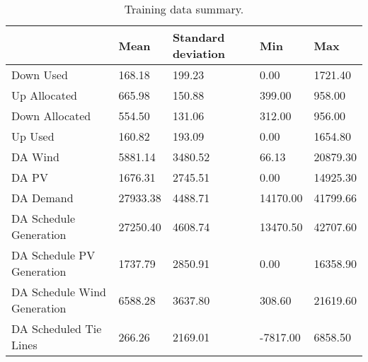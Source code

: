 \begin{table}[H] 
    \caption{Training data summary. \label{training_data_sum}}
    \begin{tabularx}{\textwidth}{CCCCC}
    \toprule
    & \textbf{Mean}	& \textbf{Standard deviation}	& \textbf{Min} & \textbf{Max}\\
    \midrule
    Down Used & 168.18 & 199.23 & 0.00 & 1721.40 \\
    Up Allocated & 665.98 & 150.88 & 399.00 & 958.00 \\
    Down Allocated & 554.50 & 131.06 & 312.00 & 956.00 \\
    Up Used & 160.82 & 193.09 & 0.00 & 1654.80 \\
    DA Wind & 5881.14 & 3480.52 & 66.13 & 20879.30 \\
    DA PV & 1676.31 & 2745.51 & 0.00 & 14925.30 \\
    DA Demand & 27933.38 & 4488.71 & 14170.00 & 41799.66 \\
    DA Schedule Generation & 27250.40 & 4608.74 & 13470.50 & 42707.60 \\
    DA Schedule PV Generation & 1737.79 & 2850.91 & 0.00 & 16358.90 \\
    DA Schedule Wind Generation & 6588.28 & 3637.80 & 308.60 & 21619.60 \\
    DA Scheduled Tie Lines & 266.26 & 2169.01 & -7817.00 & 6858.50 \\
    \bottomrule
    \end{tabularx}
\end{table}

